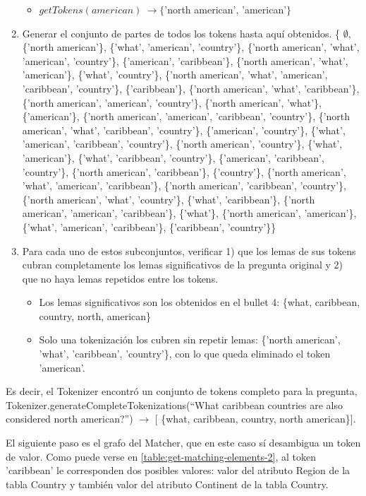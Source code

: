 \begin{enumerate}
\begin{itemize}
    \item $getTokens(american)\ \rightarrow \{$'north american', 'american'$\}$
  \end{itemize}
  \item Generar el conjunto de partes de todos los tokens hasta aquí obtenidos.
  \newline
   \{ $\emptyset$, \{'north american'\}, \{'what', 'american', 'country'\}, \{'north american', 'what', 'american', 'country'\}, \{'american', 'caribbean'\}, \{'north american', 'what', 'american'\}, \{'what', 'country'\}, \{'north american', 'what', 'american', 'caribbean', 'country'\}, \{'caribbean'\}, \{'north american', 'what', 'caribbean'\}, \{'north american', 'american', 'country'\}, \{'north american', 'what'\}, \{'american'\}, \{'north american', 'american', 'caribbean', 'country'\}, \{'north american', 'what', 'caribbean', 'country'\}, \{'american', 'country'\}, \{'what', 'american', 'caribbean', 'country'\}, \{'north american', 'country'\}, \{'what', 'american'\}, \{'what', 'caribbean', 'country'\}, \{'american', 'caribbean', 'country'\}, \{'north american', 'caribbean'\}, \{'country'\}, \{'north american', 'what', 'american', 'caribbean'\}, \{'north american', 'caribbean', 'country'\}, \{'north american', 'what', 'country'\}, \{'what', 'caribbean'\}, \{'north american', 'american', 'caribbean'\}, \{'what'\}, \{'north american', 'american'\}, \{'what', 'american', 'caribbean'\}, \{'caribbean', 'country'\}\}
  \item Para cada uno de estos subconjuntos, verificar 1) que los lemas de sus tokens cubran completamente
los lemas significativos de la pregunta original y 2) que no haya lemas repetidos
entre los tokens.
  \begin{itemize}
    \item Los lemas significativos son los obtenidos en el bullet 4: \{what, caribbean, country, north, american\}
    \item Solo una tokenización los cubren sin repetir lemas: \{'north american', 'what', 'caribbean', 'country'\}, con lo que queda eliminado el token 'american'.
  \end{itemize}
\end{enumerate}

Es decir, el Tokenizer encontró un conjunto de tokens completo para la pregunta, Tokenizer.generateCompleteTokenizations(``What caribbean countries are also considered north american?'') $\rightarrow$ [ \{what, caribbean, country, north american\}].

El siguiente paso es el grafo del Matcher, que en este caso sí desambigua un token de valor. Como puede verse en \ref{table:get-matching-elements-2}, al token 'caribbean' le corresponden dos posibles valores: valor del atributo Region de la tabla Country y también valor del atributo Continent de la tabla Country.

